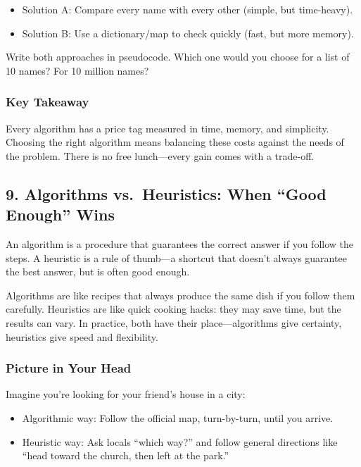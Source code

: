 \documentclass[
  letterpaper,
  DIV=11,
  numbers=noendperiod]{scrreprt}
\providecommand{\tightlist}{%
  \setlength{\itemsep}{0pt}\setlength{\parskip}{0pt}}
\begin{document}
\begin{itemize}
\tightlist
\item
  Solution A: Compare every name with every other (simple, but
  time-heavy).
\item
  Solution B: Use a dictionary/map to check quickly (fast, but more
  memory).
\end{itemize}

Write both approaches in pseudocode. Which one would you choose for a
list of 10 names? For 10 million names?

\subsubsection{Key Takeaway}\label{key-takeaway-6}

Every algorithm has a price tag measured in time, memory, and
simplicity. Choosing the right algorithm means balancing these costs
against the needs of the problem. There is no free lunch---every gain
comes with a trade-off.

\subsection{9. Algorithms vs.~Heuristics: When ``Good Enough''
Wins}\label{algorithms-vs.-heuristics-when-good-enough-wins}

An algorithm is a procedure that guarantees the correct answer if you
follow the steps. A heuristic is a rule of thumb---a shortcut that
doesn't always guarantee the best answer, but is often good enough.

Algorithms are like recipes that always produce the same dish if you
follow them carefully. Heuristics are like quick cooking hacks: they may
save time, but the results can vary. In practice, both have their
place---algorithms give certainty, heuristics give speed and
flexibility.

\subsubsection{Picture in Your Head}\label{picture-in-your-head-8}

Imagine you're looking for your friend's house in a city:

\begin{itemize}
\tightlist
\item
  Algorithmic way: Follow the official map, turn-by-turn, until you
  arrive.
\item
  Heuristic way: Ask locals ``which way?'' and follow general directions
  like ``head toward the church, then left at the park.''
\end{itemize}
\end{document}
